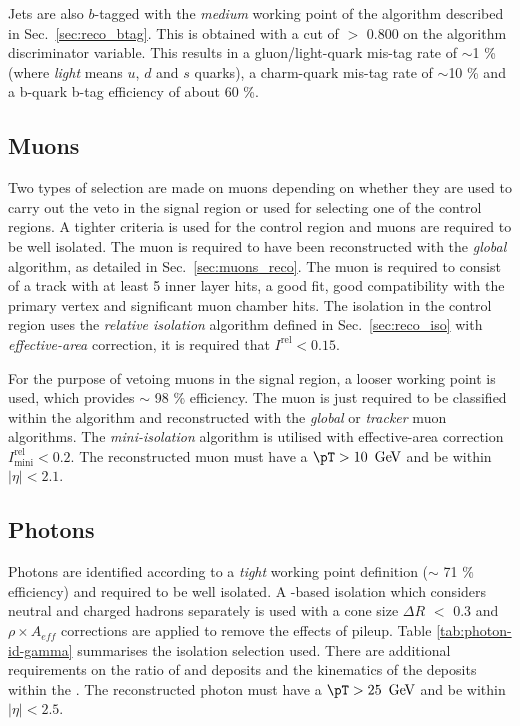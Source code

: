 Jets are also $b$-tagged with the \emph{medium} working point of the
algorithm described in Sec.~\ref{sec:reco_btag}. This is obtained with
a cut of $>$ 0.800 on the algorithm discriminator variable. This
results in a gluon/light-quark mis-tag rate of $\sim$1 \% (where
\emph{light} means $u$, $d$ and $s$ quarks), a charm-quark mis-tag
rate of $\sim$10 \% and a b-quark b-tag efficiency of about 60 \%. 


\subsection{Muons}
\label{sec:muon-id}
Two types of selection are made on muons depending on whether they are
used to carry out the veto in the signal region or used for selecting
one of the control regions. A tighter criteria is used for the control
region and muons are required to be well isolated. The muon is
required to have been
reconstructed with the \emph{global} algorithm, as detailed in
Sec.~\ref{sec:muons_reco}. The muon is required to consist of a track
with at least 5 inner layer hits, a good fit, good compatibility with
the primary vertex and significant muon chamber hits. The isolation in
the control region uses the \emph{relative isolation} algorithm
defined in Sec.~\ref{sec:reco_iso} with \emph{effective-area}
correction, it is required that $I^{\textrm{rel}}<0.15$.  

For the purpose of vetoing muons in the signal region, a looser
working point is used, which provides $\sim$ 98 $\%$ efficiency. The
muon is just required to be classified within the \PF algorithm and
reconstructed with the \emph{global} or \emph{tracker} muon
algorithms. The
\emph{mini-isolation} algorithm is utilised with effective-area \PU
correction $I^{\textrm{rel}}_{\textrm{mini}} < 0.2$. The reconstructed
muon must have a $\pT>10~\gev$ and be within $|\eta|<2.1$.

\subsection{Photons}
\label{sec:photon-id}

Photons are identified according to a \emph{tight} working point
definition ($\sim$ 71 $\%$ efficiency) and required to be well
isolated.  A \PF-based isolation which considers neutral and charged
hadrons separately is used with a cone size $\Delta R$
$<$ 0.3 and $\rho\times A_{eff}$ corrections are applied to remove the
effects of pileup.  Table \ref{tab:photon-id-gamma}
summarises the isolation selection used. There are additional
requirements on the ratio of \HCAL and \ECAL deposits and the
kinematics of the deposits within the \ECAL. The reconstructed
photon must have a $\pT>25~\gev$ and be within $|\eta|<2.5$.


